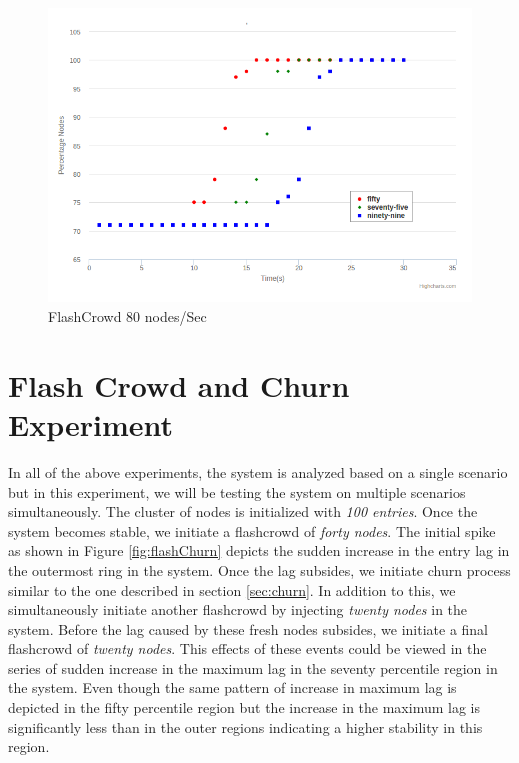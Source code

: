 \documentclass[a4paper,11pt]{kth-mag}
\begin{document}
\begin{figure}[h]
	\includegraphics[scale=0.5]{200-80Nodes}
	\caption{FlashCrowd 80 nodes/Sec }
	\label{fig:flash80}
\end{figure}



\section{Flash Crowd and Churn Experiment}

In all of the above experiments, the system is analyzed based on a single scenario but in this experiment, we will be testing the system on multiple scenarios simultaneously. The cluster of nodes is initialized with \textit{100 entries}. Once the system becomes stable, we initiate a flashcrowd of \textit{forty nodes}. The initial spike as shown in Figure \ref{fig:flashChurn} depicts the sudden increase in the entry lag in the outermost ring in the system. Once the lag subsides, we initiate churn process similar to the one described in section  \ref{sec:churn}. In addition to this, we simultaneously initiate another flashcrowd by injecting \textit{twenty nodes} in the system. Before the lag caused by these fresh nodes subsides, we initiate a final flashcrowd of \textit{twenty nodes}. This effects of these events could be viewed in the series of sudden increase in the maximum lag in the seventy percentile region in the system. Even though the same pattern of increase in maximum lag is depicted in the fifty percentile region but the increase in the maximum lag is significantly less than in the outer regions indicating a higher stability in this region. 
\end{document}
